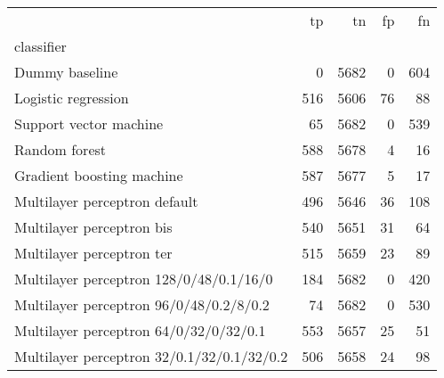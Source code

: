 \begin{tabular}{lrrrr}
\toprule
 & tp & tn & fp & fn \\
classifier &  &  &  &  \\
\midrule
Dummy baseline & 0 & 5682 & 0 & 604 \\
Logistic regression & 516 & 5606 & 76 & 88 \\
Support vector machine & 65 & 5682 & 0 & 539 \\
Random forest & 588 & 5678 & 4 & 16 \\
Gradient boosting machine & 587 & 5677 & 5 & 17 \\
Multilayer perceptron default & 496 & 5646 & 36 & 108 \\
Multilayer perceptron bis & 540 & 5651 & 31 & 64 \\
Multilayer perceptron ter & 515 & 5659 & 23 & 89 \\
Multilayer perceptron 128/0/48/0.1/16/0 & 184 & 5682 & 0 & 420 \\
Multilayer perceptron 96/0/48/0.2/8/0.2 & 74 & 5682 & 0 & 530 \\
Multilayer perceptron 64/0/32/0/32/0.1 & 553 & 5657 & 25 & 51 \\
Multilayer perceptron 32/0.1/32/0.1/32/0.2 & 506 & 5658 & 24 & 98 \\
\bottomrule
\end{tabular}
